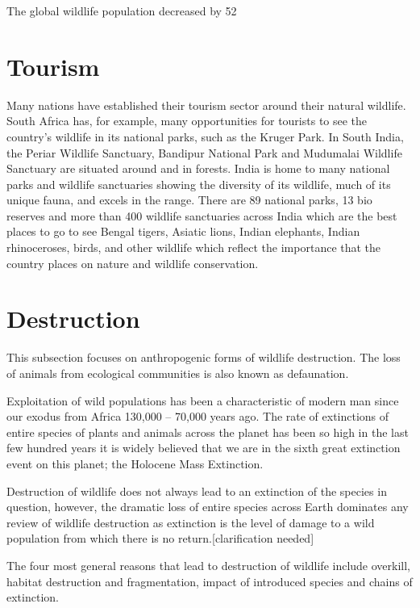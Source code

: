 \documentclass[a4paper,11pt]{report}
\begin{document}
The global wildlife population decreased by 52%
\section{Tourism}
Many nations have established their tourism sector around their natural wildlife. South Africa has, for example, many opportunities for tourists to see the country's wildlife in its national parks, such as the Kruger Park. In South India, the Periar Wildlife Sanctuary, Bandipur National Park and Mudumalai Wildlife Sanctuary are situated around and in forests. India is home to many national parks and wildlife sanctuaries showing the diversity of its wildlife, much of its unique fauna, and excels in the range. There are 89 national parks, 13 bio reserves and more than 400 wildlife sanctuaries across India which are the best places to go to see Bengal tigers, Asiatic lions, Indian elephants, Indian rhinoceroses, birds, and other wildlife which reflect the importance that the country places on nature and wildlife conservation.

\section{Destruction}
This subsection focuses on anthropogenic forms of wildlife destruction. The loss of animals from ecological communities is also known as defaunation.

Exploitation of wild populations has been a characteristic of modern man since our exodus from Africa 130,000 – 70,000 years ago. The rate of extinctions of entire species of plants and animals across the planet has been so high in the last few hundred years it is widely believed that we are in the sixth great extinction event on this planet; the Holocene Mass Extinction.

Destruction of wildlife does not always lead to an extinction of the species in question, however, the dramatic loss of entire species across Earth dominates any review of wildlife destruction as extinction is the level of damage to a wild population from which there is no return.[clarification needed]

The four most general reasons that lead to destruction of wildlife include overkill, habitat destruction and fragmentation, impact of introduced species and chains of extinction.
\end{document}
